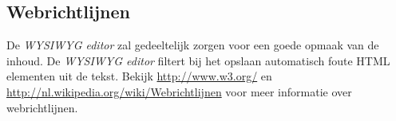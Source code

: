 \subsection{Webrichtlijnen}\label{webrichtlijnen}
De \emph{WYSIWYG editor} zal gedeeltelijk zorgen voor een goede opmaak van de inhoud. De  \emph{WYSIWYG editor} filtert bij het opslaan automatisch foute HTML elementen uit de tekst. Bekijk \url{http://www.w3.org/} en \url{http://nl.wikipedia.org/wiki/Webrichtlijnen} voor meer informatie over webrichtlijnen. 